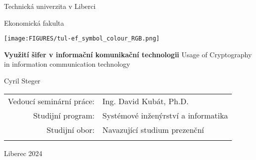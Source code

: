 \pagestyle{empty}
\begin{center}
    
    {\large Technická univerzita v Liberci}

    \medskip
    {\large Ekonomická fakulta}
    \vfill
    \centerline{\mbox{\texttt{[image: \\FIGURES/tul-ef\_symbol\_colour\_RGB.png]}}} %
    \vfill
    \vspace{5mm}
    {\LARGE\bfseries Využití šifer v informační komunikační technologii}
    \vspace{5mm}
    {\large Usage of Cryptography in information communication technology}

    \vfill
    \vspace{5mm}
    {\large Cyril Steger}
    
    \vfill
    \begin{tabular}{rl}
        Vedoucí seminární práce: &  Ing. David Kubát, Ph.D.\\   %
        \noalign{\vspace{2mm}}
        Studijní program: & Systémové inženýrství a informatika\\
        \noalign{\vspace{2mm}}
        Studijní obor: & Navazující studium prezenční\\
        \noalign{\vspace{2mm}}
    \end{tabular}
    \medskip

    \vfill
    {\large Liberec 2024}
    
\end{center}